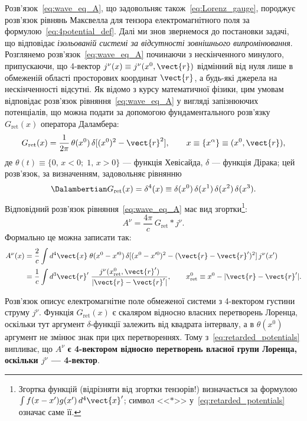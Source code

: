 Розв'язок~\eqref{eq:wave_eq_A}, що задовольняє також~\eqref{eq:Lorenz_gauge}, породжує розв'язок рівнянь Максвелла для тензора електромагнітного поля за формулою~\eqref{eq:4potential_def}. Далі ми знов звернемося до постановки задачі, що відповідає \emph{ізольованій системі за відсутності зовнішнього випромінювання}. Розглянемо розв'язок~\eqref{eq:wave_eq_A} починаючи з нескінченного минулого, припускаючи, що 4-вектор $j^{\nu}(x)\equiv j^{\nu}(x^0,\vect{r})$ відмінний від нуля лише в обмеженій області просторових координат $\vect{r}$, а будь-які джерела на нескінченності відсутні. Як відомо з курсу математичної фізики, цим умовам відповідає розв'язок рівняння~\eqref{eq:wave_eq_A} у вигляді запізнюючих потенціалів, що можна подати за допомогою фундаментального розв'язку $G_\text{ret}(x)$ оператора Даламбера:
\begin{equation*}
    G_{\text{ret}}(x) = \frac{1}{2\pi}\,\theta(x^0)\,\delta[(x^0)^2 - \vect{r}^2],
    \qquad x\equiv\{x^{\alpha}\}\equiv(x^0,\vect{r}),
\end{equation*}
де $\theta(t)\equiv\{0,\,x<0;\;1,\,x>0\}$ --- функція Хевісайда, $\delta$ --- функція Дірака; цей розв'язок, за визначенням, задовольняє рівнянню
\begin{equation*}
    \Dalambertian G_{\text{ret}}(x) = \delta^4(x)
    \equiv \delta(x^0)\,\delta(x^1)\,\delta(x^2)\,\delta(x^3).
\end{equation*}
Відповідний розв'язок рівняння~\eqref{eq:wave_eq_A} має вид згортки\footnote{Згортка функцій (відрізняти від згортки тензорів!) визначається за формулою
$\int f(x-x')g(x')\,d^4\vect{x}'$; символ <<$*$>> у~\eqref{eq:retarded_potentials} означає саме її.}:
\begin{equation}\label{eq:retarded_potentials}
    A^{\nu} = \frac{4\pi}{c}\,G_{\text{ret}}*j^{\nu}.
\end{equation}
Формально це можна записати так:
\begin{align*}
    A^{\nu}(x) &= \frac{2}{c}\int d^4\vect{x}\;
    \theta(x^0-x'^0)\,\delta[(x^0-x'^0)^2 - (\vect{r}-\vect{r}')^2]\,
    j^{\nu}(x') \\
    &= \frac{1}{c}\int d^3\vect{r}'\;
    \frac{j^{\nu}(x_{\text{ret}}^0,\vect{r}')}{|\vect{r}-\vect{r}'|},
    \qquad x_{\text{ret}}^0 \equiv x^0 - |\vect{r}-\vect{r}'|.
\end{align*}

Розв'язок описує електромагнітне поле обмеженої системи з 4-вектором густини струму $j^{\nu}$. Функція $G_\text{ret}(x)$ є скаляром відносно власних перетворень Лоренца,
оскільки тут аргумент $\delta$-функції залежить від квадрата інтервалу, а в $\theta(x^0)$ аргумент не змінює знак при цих перетвореннях. Тому з~\eqref{eq:retarded_potentials} випливає, що $A^{\nu}$ \textbf{є 4-вектором відносно перетворень власної групи Лоренца, оскільки $j^{\nu}$ --- 4-вектор}.

